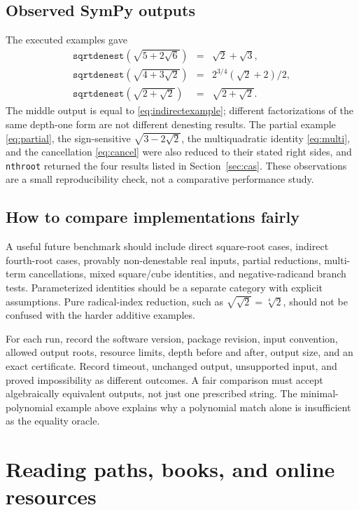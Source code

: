 \documentclass[11pt,oneside]{article}
\numberwithin{equation}{section}
\theoremstyle{definition}
\theoremstyle{remark}
\begin{document}
\subsection{Observed SymPy outputs}
The executed examples gave
\[
\begin{array}{rcl}
\texttt{sqrtdenest}(\sqrt{5+2\sqrt6})&=&\sqrt2+\sqrt3,\\[3pt]
\texttt{sqrtdenest}(\sqrt{4+3\sqrt2})&=&
2^{3/4}(\sqrt2+2)/2,\\[3pt]
\texttt{sqrtdenest}(\sqrt{2+\sqrt2})&=&\sqrt{2+\sqrt2}.
\end{array}
\]
The middle output is equal to \eqref{eq:indirectexample}; different factorizations of the same depth-one form are not different denesting results. The partial example \eqref{eq:partial}, the sign-sensitive $\sqrt{3-2\sqrt2}$, the multiquadratic identity \eqref{eq:multi}, and the cancellation \eqref{eq:cancel} were also reduced to their stated right sides, and \texttt{nthroot} returned the four results listed in Section~\ref{sec:cas}. These observations are a small reproducibility check, not a comparative performance study.

\subsection{How to compare implementations fairly}
A useful future benchmark should include direct square-root cases, indirect fourth-root cases, provably non-denestable real inputs, partial reductions, multi-term cancellations, mixed square/cube identities, and negative-radicand branch tests. Parameterized identities should be a separate category with explicit assumptions. Pure radical-index reduction, such as $\sqrt{\sqrt2}=\sqrt[4]2$, should not be confused with the harder additive examples.

For each run, record the software version, package revision, input convention, allowed output roots, resource limits, depth before and after, output size, and an exact certificate. Record timeout, unchanged output, unsupported input, and proved impossibility as different outcomes. A fair comparison must accept algebraically equivalent outputs, not just one prescribed string. The minimal-polynomial example above explains why a polynomial match alone is insufficient as the equality oracle.

\section{Reading paths, books, and online resources}\label{sec:reading}
\end{document}
